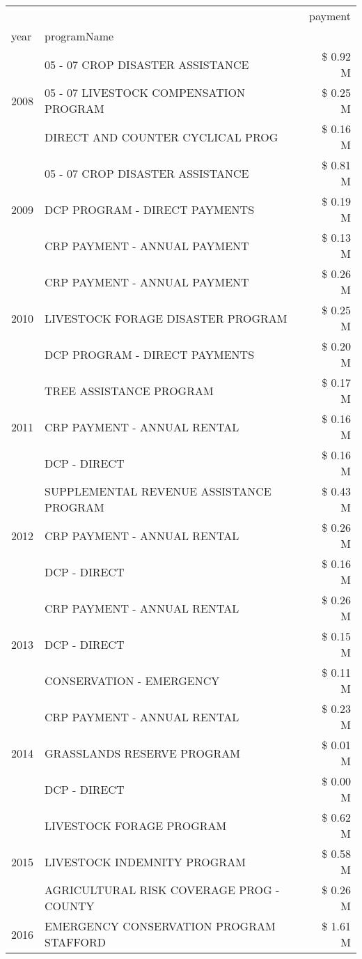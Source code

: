 \begin{tabular}{llr}
\toprule
 &  & payment \\
year & programName &  \\
\midrule
\multirow[t]{3}{*}{2008} & 05 - 07 CROP DISASTER ASSISTANCE & \$ 0.92 M \\
 & 05 - 07 LIVESTOCK COMPENSATION PROGRAM & \$ 0.25 M \\
 & DIRECT AND COUNTER CYCLICAL PROG & \$ 0.16 M \\
\cline{1-3}
\multirow[t]{3}{*}{2009} & 05 - 07 CROP DISASTER ASSISTANCE & \$ 0.81 M \\
 & DCP PROGRAM - DIRECT PAYMENTS & \$ 0.19 M \\
 & CRP PAYMENT - ANNUAL PAYMENT & \$ 0.13 M \\
\cline{1-3}
\multirow[t]{3}{*}{2010} & CRP PAYMENT - ANNUAL PAYMENT & \$ 0.26 M \\
 & LIVESTOCK FORAGE DISASTER  PROGRAM & \$ 0.25 M \\
 & DCP PROGRAM - DIRECT PAYMENTS & \$ 0.20 M \\
\cline{1-3}
\multirow[t]{3}{*}{2011} & TREE ASSISTANCE PROGRAM & \$ 0.17 M \\
 & CRP PAYMENT - ANNUAL RENTAL & \$ 0.16 M \\
 & DCP - DIRECT & \$ 0.16 M \\
\cline{1-3}
\multirow[t]{3}{*}{2012} & SUPPLEMENTAL REVENUE ASSISTANCE PROGRAM & \$ 0.43 M \\
 & CRP PAYMENT - ANNUAL RENTAL & \$ 0.26 M \\
 & DCP - DIRECT & \$ 0.16 M \\
\cline{1-3}
\multirow[t]{3}{*}{2013} & CRP PAYMENT - ANNUAL RENTAL & \$ 0.26 M \\
 & DCP - DIRECT & \$ 0.15 M \\
 & CONSERVATION - EMERGENCY & \$ 0.11 M \\
\cline{1-3}
\multirow[t]{3}{*}{2014} & CRP PAYMENT - ANNUAL RENTAL & \$ 0.23 M \\
 & GRASSLANDS RESERVE PROGRAM & \$ 0.01 M \\
 & DCP - DIRECT & \$ 0.00 M \\
\cline{1-3}
\multirow[t]{3}{*}{2015} & LIVESTOCK FORAGE PROGRAM & \$ 0.62 M \\
 & LIVESTOCK INDEMNITY PROGRAM & \$ 0.58 M \\
 & AGRICULTURAL RISK COVERAGE PROG - COUNTY & \$ 0.26 M \\
\cline{1-3}
\multirow[t]{3}{*}{2016} & EMERGENCY CONSERVATION PROGRAM STAFFORD & \$ 1.61 M \\

\end{tabular}
